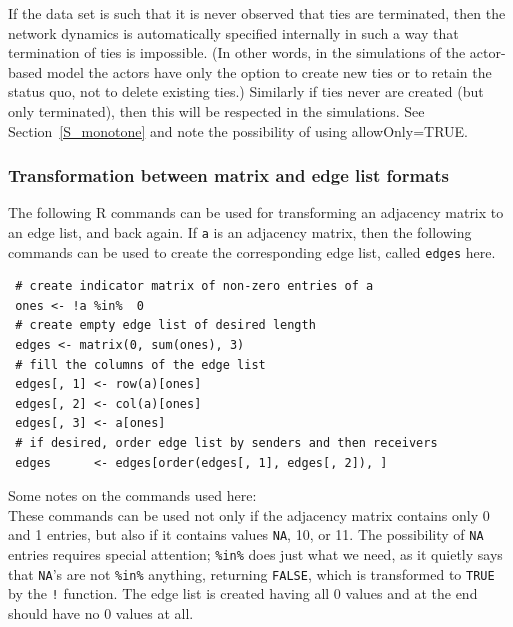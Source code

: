 \documentclass[a4paper,fleqn,11pt]{article}
\newcommand{\+}{\, + \,}
\newcommand{\sfn}[1]{\textsf{#1}}
\newcommand{\R}{{\sf R }}
\begin{document}
If the data set is such that it is never observed that ties are terminated,
then the network dynamics is automatically specified internally in such a way
that termination of ties is impossible.
(In other words, in the simulations of the actor-based model
the actors have only the option to create new ties or to retain
the status quo, not to delete existing ties.)
Similarly if ties never are created (but only terminated),
then this will be respected in the simulations.
See Section~\ref{S_monotone} and note the possibility
of using \sfn{allowOnly=TRUE}.

\subsubsection{Transformation between matrix and edge list formats}
\label{S_trafos}

The following \R commands can be used for transforming an
adjacency matrix to an edge list, and back again.
If \texttt{a} is an adjacency matrix, then the following commands
can be used to create the corresponding edge list,
called \texttt{edges} here.
 \begin{verbatim}
 # create indicator matrix of non-zero entries of a
 ones <- !a %in%  0
 # create empty edge list of desired length
 edges <- matrix(0, sum(ones), 3)
 # fill the columns of the edge list
 edges[, 1] <- row(a)[ones]
 edges[, 2] <- col(a)[ones]
 edges[, 3] <- a[ones]
 # if desired, order edge list by senders and then receivers
 edges      <- edges[order(edges[, 1], edges[, 2]), ]
 \end{verbatim}
Some notes on the commands used here:\\
These commands can be used not only if the adjacency matrix
contains only 0 and 1 entries, but also if it contains values
\texttt{NA}, 10, or 11. The possibility of \texttt{NA}
entries requires special attention;
\texttt{\%in\%}
does just what we need, as it quietly says that
\texttt{NA}'s are not \texttt{\%in\%}
anything, returning \texttt{FALSE}, which is transformed to
\texttt{TRUE} by the \texttt{!} function.
The edge list is created having all 0 values and at the end
should have no 0 values at all.
\end{document}
